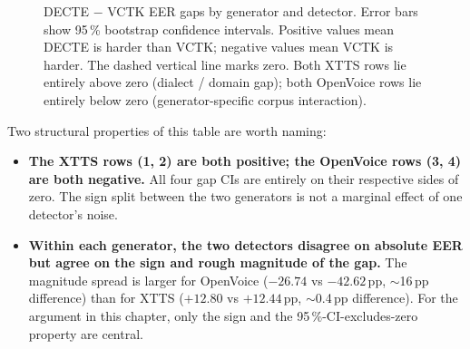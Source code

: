 \begin{figure}[t]
\centering
{}
\caption{DECTE $-$ VCTK EER gaps by generator and detector. Error bars show 95\,\% bootstrap confidence intervals. Positive values mean DECTE is harder than VCTK; negative values mean VCTK is harder. The dashed vertical line marks zero. Both XTTS rows lie entirely above zero (dialect / domain gap); both OpenVoice rows lie entirely below zero (generator-specific corpus interaction).}
\label{fig:gap-direction-forest}
\end{figure}

Two structural properties of this table are worth naming:

\begin{itemize}
    \item \textbf{The XTTS rows (1, 2) are both positive; the OpenVoice rows
        (3, 4) are both negative.} All four gap CIs are entirely on
        their respective sides of zero. The sign split between the two
        generators is not a marginal effect of one detector's noise.
    \item \textbf{Within each generator, the two detectors disagree on absolute
        EER but agree on the sign and rough magnitude of the gap.}
        The magnitude spread is larger for OpenVoice ($-26.74$ vs
        $-42.62$\,pp, $\sim$16\,pp difference) than for XTTS ($+12.80$ vs
        $+12.44$\,pp, $\sim$0.4\,pp difference). For the argument in this
        chapter, only the sign and the 95\,\%-CI-excludes-zero property
        are central.
\end{itemize}


